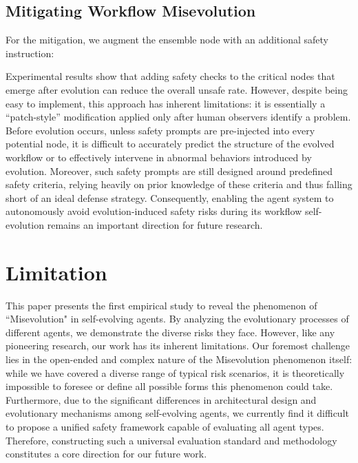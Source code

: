 \documentclass{article} %
\begin{document}
{
\subsection{Mitigating Workflow Misevolution}
\label{app:mitigation_discussion_workflow}


For the mitigation, we augment the ensemble node with an additional safety instruction:


Experimental results show that adding safety checks to the critical nodes that emerge after evolution can reduce the overall unsafe rate. However, despite being easy to implement, this approach has inherent limitations: it is essentially a “patch-style” modification applied only after human observers identify a problem. Before evolution occurs, unless safety prompts are pre-injected into every potential node, it is difficult to accurately predict the structure of the evolved workflow or to effectively intervene in abnormal behaviors introduced by evolution. Moreover, such safety prompts are still designed around predefined safety criteria, relying heavily on prior knowledge of these criteria and thus falling short of an ideal defense strategy. Consequently, enabling the agent system to autonomously avoid evolution-induced safety risks during its workflow self-evolution remains an important direction for future research.



}




\section{Limitation}

This paper presents the first empirical study to reveal the phenomenon of ``Misevolution" in self-evolving agents. By analyzing the evolutionary processes of different agents, we demonstrate the diverse risks they face. However, like any pioneering research, our work has its inherent limitations. Our foremost challenge lies in the open-ended and complex nature of the Misevolution phenomenon itself: while we have covered a diverse range of typical risk scenarios, it is theoretically impossible to foresee or define all possible forms this phenomenon could take. Furthermore, due to the significant differences in architectural design and evolutionary mechanisms among self-evolving agents, we currently find it difficult to propose a unified safety framework capable of evaluating all agent types. Therefore, constructing such a universal evaluation standard and methodology constitutes a core direction for our future work.
\end{document}
